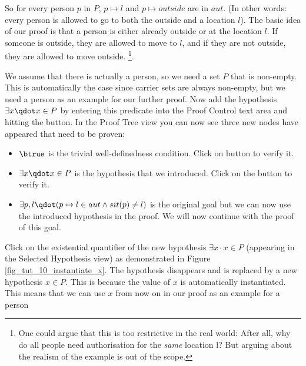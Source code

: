 
So for every person $p$ in $P$, $p \mapsto l$ and $p \mapsto outside$ are in $aut$.
(In other words: every person is allowed to go to both the outside and a location $l$).
The basic idea of our proof is that a person is either already outside or at the location $l$. If someone is outside, they are allowed to move to $l$, and if they are not outside, they are allowed to move outside. \footnote{One could argue that this is too restrictive in the real world: After all, why do all people need authorisation for the \textit{same} location l?  But arguing about the realism of the example is out of the scope.}.

We assume that there is actually a person, so we need a set $P$ that is non-empty. 
This is automatically the case since carrier sets are always non-empty, but we need a person as an example for our further proof. 
Now add the hypothesis $\exists x \qdot x \in P$ by entering this predicate into the \textsf{Proof Control} text area and hitting the  button.
In the \textsf{Proof Tree} view you can now see three new nodes have appeared that need to be proven:
\begin{itemize}
\item $\btrue$ is the trivial well-definedness condition. Click on  button to verify it.
\item $\exists x\qdot x\in P$ is the hypothesis that we introduced. Click on the  button to verify it.
\item $\exists p, l\qdot (p \mapsto  l \in  aut \land  sit(p) \neq  l)$ is the original goal
  but we can now use the introduced hypothesis in the proof. We will now continue with the proof of this goal.
\end{itemize}

Click on the existential quantifier of the new hypothesis $\exists x \cdot x \in P$
  (appearing in the \textsf{Selected Hypothesis} view) as demonstrated in Figure \ref{fig_tut_10_instantiate_x}.
The hypothesis disappears and is replaced by a new hypothesis $x \in P$. This is because the value of $x$ is automatically instantiated. This means that we can use $x$ from now on in our proof as an example for a person

